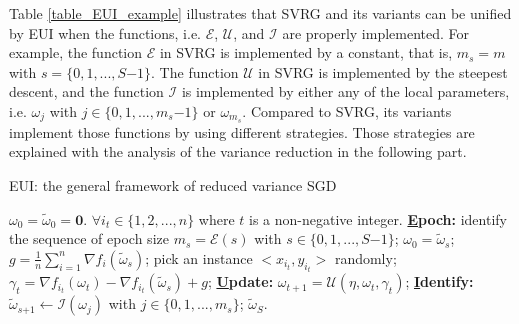 \documentclass[letterpaper]{article}
\begin{document}
Table \ref{table_EUI_example} illustrates that SVRG and  its variants can be unified by EUI when  the functions, i.e. $\mathcal{E}$, $\mathcal{U}$, and $\mathcal{I}$ are properly implemented. For example,  the function $\mathcal{E}$ in SVRG is implemented by a constant, that is, $m_s\mathrm{=}m$ with $s\mathrm{=}\{0,1, ..., S\mathrm{-}1\}$. The function $\mathcal{U}$ in SVRG is  implemented by the steepest descent, and the function $\mathcal{I}$ is implemented by either any of the local parameters, i.e. $\omega_j$ with $j\in\{0,1, ..., m_s\mathrm{-}1\}$ or $\omega_{m_s}$.  Compared to  SVRG, its variants implement those functions by using different strategies. Those strategies are explained with the analysis of the variance reduction in the following part. 




\begin{algorithm}[t]
    \caption{EUI: the general framework of  reduced variance SGD}
    \label{algorithm_EUI}
    \begin{algorithmic}[1]
        \Require $\omega_0\mathrm{=}\tilde{\omega}_0\mathrm{=}\mathbf{0}$. $\forall i_t\mathrm{\in}\{1,2, ..., n\}$ where $t$ is a non-negative integer.
        \State \textbf{\uline{E}poch:} identify the sequence of  epoch size $m_s\mathrm{=} \mathcal{E}(s)$ with $s\in\{0,1, ..., S\mathrm{-}1\}$;
            \State $\omega_0=\tilde{\omega}_s$;
            \State $g=\frac{1}{n}\sum\limits_{i=1}^n\nabla f_i(\tilde{\omega}_s)$;
                \State pick an instance $\mathrm{<}x_{i_t}, y_{i_t}\mathrm{>}$ randomly;
                \State $\gamma_{t}=\nabla f_{i_t}(\omega_{t})-\nabla f_{i_t}(\tilde{\omega}_s)+g$;
                \State \textbf{\uline{U}pdate:} $\omega_{t+1}=\mathcal{U}(\eta, \omega_{t}, \gamma_{t})$;
            \EndFor
            \State \textbf{\uline{I}dentify:} $\tilde{\omega}_{s\mathrm{+}1}\mathrm{\leftarrow}\mathcal{I}(\omega_j)$ with $j\mathrm{\in}\{0,1, ..., m_s\}$;
        \EndFor
        \Return $\tilde{\omega}_S$.
    \end{algorithmic}
\end{algorithm}
\end{document}
